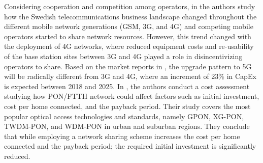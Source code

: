 






Considering cooperation and competition among operators, in \cite{Markendahl666147} the authors study how the Swedish telecommunications business landscape changed throughout the different mobile network generations (GSM, 3G, and 4G) and competing mobile operators started to share network resources. However, this trend changed with the deployment of 4G networks, where reduced equipment costs and re-usability of the base station sites between 3G and 4G played a role in disincentivizing operators to share. %
Based on the market reports in \cite{GABRIEL}, the upgrade pattern to \ac{5G} will be radically different from 3G and 4G, where an increment of 23\% in \ac{CapEx} is expected between 2018 and 2025.
In \cite{6871680}, the authors conduct a cost assessment studying how \ac{PON}/\ac{FTTH} network could affect factors such as initial investment, cost per home connected, and the payback period. Their study covers the most popular optical access technologies and standards, namely \ac{GPON}, XG-PON, TWDM-PON, and \ac{WDM}-\ac{PON} in urban and suburban regions. They conclude that while employing a network sharing scheme increases the cost per home connected and the payback period; the required initial investment is significantly reduced.

